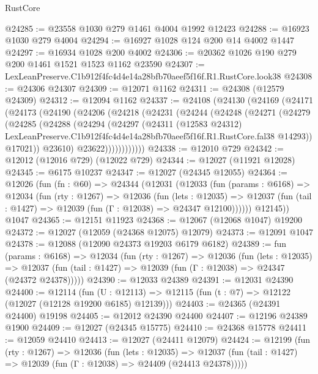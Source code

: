 \begin{lexlean}{RustCore}
\begin{coremodule}
@24285 := @23558 @1030 @279 @1461 @4004 @1992 @12423
@24288 := @16923 @1030 @279 @4004
@24294 := @16927 @1028 @124 @200 @14 @4002 @1447
@24297 := @16934 @1028 @200 @4002
@24306 := @20362 @1026 @190 @279 @200 @1461 @1521 @1523 @1162 @23590
@24307 := LexLeanPreserve.C1b912f4fc4d4e14a28bfb70aeef5f16f.R1.RustCore.look38
@24308 := @24306 @24307
@24309 := @12071 @1162
@24311 := @24308 (@12579 @24309)
@24312 := @12094 @1162
@24337 := @24108
    (@24130
      (@24169
        (@24171
          (@24173
            (@24190
              (@24206
                (@24218
                  (@24231
                    (@24244
                      (@24248
                        (@24271
                          (@24279
                            (@24285
                              (@24288
                                (@24294
                                  (@24297
                                    (@24311
                                      (@12583 @24312)
                                      LexLeanPreserve.C1b912f4fc4d4e14a28bfb70aeef5f16f.R1.RustCore.fal38
                                      @14293))
                                  @17021))
                              @23610)
                            @23622))))))))))))
@24338 := @12010 @729
@24342 := @12012 (@12016 @729) (@12022 @729)
@24344 := @12027 (@11921 @12028)
@24345 := @6175 @10237
@24347 := @12027 (@24345 @12055)
@24364 := @12026
    (fun (fn : @60) =>
    @24344
      (@12031
        (@12033
          (fun (params : @6168) =>
          @12034
            (fun (rty : @1267) =>
            @12036
              (fun (lets : @12035) =>
              @12037 (fun (tail : @1427) => @12039 (fun (Γ : @12038) => @24347 @12100))))))
        @12145))
    @1047
@24365 := @12151 @11923
@24368 := @12067 (@12068 @1047) @19200
@24372 := @12027 (@12059 (@24368 @12075) @12079)
@24373 := @12091 @1047
@24378 := @12088 (@12090 @24373 @19203 @6179 @6182)
@24389 := fun (params : @6168) =>
  @12034
    (fun (rty : @1267) =>
    @12036
      (fun (lets : @12035) =>
      @12037 (fun (tail : @1427) => @12039 (fun (Γ : @12038) => @24347 (@24372 @24378)))))
@24390 := @12033 @24389
@24391 := @12031 @24390
@24400 := @12114
    (fun (U : @12113) => @12115 (fun (t : @7) => @12122 (@12027 (@12128 @19200 @6185) @12139)))
@24403 := @24365 (@24391 @24400) @19198
@24405 := @12012 @24390 @24400
@24407 := @12196 @24389 @1900
@24409 := @12027 (@24345 @15775)
@24410 := @24368 @15778
@24411 := @12059 @24410
@24413 := @12027 (@24411 @12079)
@24424 := @12199
    (fun (rty : @1267) =>
    @12036
      (fun (lets : @12035) =>
      @12037 (fun (tail : @1427) => @12039 (fun (Γ : @12038) => @24409 (@24413 @24378)))))

\end{coremodule}
\end{lexlean}
